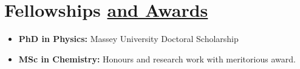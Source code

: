 \section{Fellowships \href{.}{and Awards}}

\begin{itemize}
    \itemsep-1mm
    \item {\bf PhD in Physics:} Massey University Doctoral Scholarship %
    \item {\bf MSc in Chemistry:} Honours and research work with
          meritorious award.
\end{itemize}
